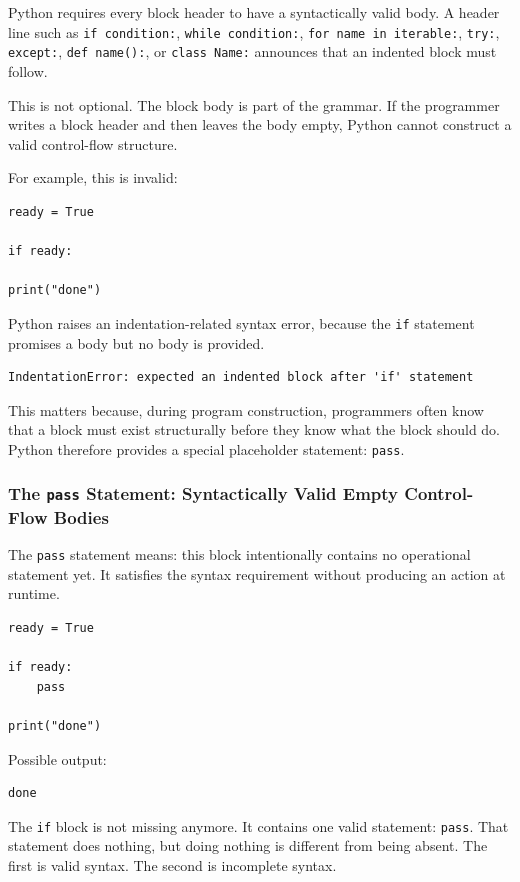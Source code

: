 \documentclass[a4paper,twoside]{report}
\begin{document}
Python requires every block header to have a syntactically valid body. A header line such as \texttt{if condition:}, \texttt{while condition:}, \texttt{for name in iterable:}, \texttt{try:}, \texttt{except:}, \texttt{def name():}, or \texttt{class Name:} announces that an indented block must follow.

This is not optional. The block body is part of the grammar. If the programmer writes a block header and then leaves the body empty, Python cannot construct a valid control-flow structure.

For example, this is invalid:

\begin{verbatim}
ready = True

if ready:

print("done")
\end{verbatim}

Python raises an indentation-related syntax error, because the \texttt{if} statement promises a body but no body is provided.

\begin{verbatim}
IndentationError: expected an indented block after 'if' statement
\end{verbatim}

This matters because, during program construction, programmers often know that a block must exist structurally before they know what the block should do. Python therefore provides a special placeholder statement: \texttt{pass}.

\subsubsection{The \texttt{pass} Statement: Syntactically Valid Empty Control-Flow Bodies}

The \texttt{pass} statement means: this block intentionally contains no operational statement yet. It satisfies the syntax requirement without producing an action at runtime.

\begin{verbatim}
ready = True

if ready:
    pass

print("done")
\end{verbatim}

Possible output:

\begin{verbatim}
done
\end{verbatim}

The \texttt{if} block is not missing anymore. It contains one valid statement: \texttt{pass}. That statement does nothing, but doing nothing is different from being absent. The first is valid syntax. The second is incomplete syntax.
\end{document}
